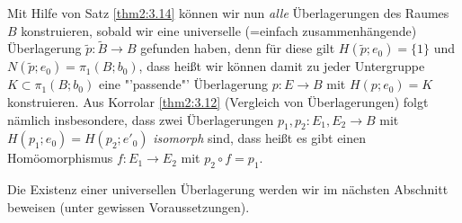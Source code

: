 \documentclass[a4paper,10pt]{scrartcl}
\begin{document}
Mit Hilfe von Satz \ref{thm2:3.14} können wir nun \emph{alle} Überlagerungen des Raumes $B$ konstruieren, sobald wir eine universelle (=einfach zusammenhängende) Überlagerung $\tilde p: \tilde B\to B$ gefunden haben, denn für diese gilt $H(\tilde p; e_0)=\{1\}$ und $N(\tilde p; e_0)=\pi_1(B;b_0)$, dass heißt wir können damit zu jeder Untergruppe $K\subset \pi_1(B;b_0)$ eine "'passende"' Überlagerung $p:E\to B$ mit $H(p;e_0)=K$ konstruieren.
Aus Korrolar \ref{thm2:3.12} (Vergleich von Überlagerungen) folgt nämlich insbesondere, dass zwei Überlagerungen $p_1, p_2: E_1, E_2 \to B$ mit $H(p_1;e_0)=H(p_2;e'_0)$ \emph{isomorph} sind, dass heißt es gibt einen Homöomorphismus $f:E_1\to E_2$ mit $p_2\circ f = p_1$.

Die Existenz einer universellen Überlagerung werden wir im nächsten Abschnitt beweisen (unter gewissen Voraussetzungen).
\end{document}

